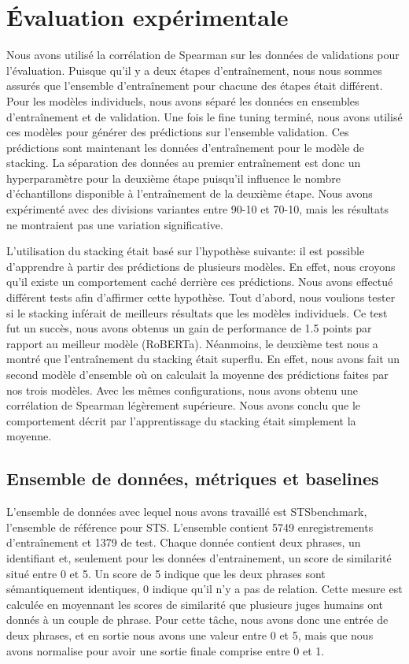 \documentclass[11pt,a4paper, french]{article}
\begin{document}
\section{Évaluation expérimentale }

Nous avons utilisé la corrélation de Spearman sur les données de validations pour l’évaluation. Puisque qu’il y a deux étapes d'entraînement, nous nous sommes assurés que l’ensemble d'entraînement pour chacune des étapes était différent. Pour les modèles individuels, nous avons séparé les données en ensembles d'entraînement et de validation. Une fois le fine tuning terminé, nous avons utilisé ces modèles pour générer des prédictions sur l’ensemble validation. Ces prédictions sont maintenant les données d'entraînement pour le modèle de stacking. La séparation des données au premier entraînement est donc un hyperparamètre pour la deuxième étape puisqu’il influence le nombre d’échantillons disponible à l'entraînement de la deuxième étape. Nous avons expérimenté avec des divisions variantes entre 90-10 et 70-10, mais les résultats ne montraient pas une variation significative. 

	L’utilisation du stacking était basé sur l’hypothèse suivante: il est possible d’apprendre à partir des prédictions de plusieurs modèles. En effet, nous croyons qu’il existe un comportement caché derrière ces prédictions. Nous avons effectué différent tests afin d’affirmer cette hypothèse. Tout d'abord, nous voulions tester si le stacking inférait de meilleurs résultats que les modèles individuels. Ce test fut un succès, nous avons obtenus un gain de performance de 1.5 points par rapport au meilleur modèle (RoBERTa). Néanmoins, le deuxième test nous a montré que l'entraînement du stacking était superflu. En effet, nous avons fait un second modèle d’ensemble où on calculait la moyenne des prédictions faites par nos trois modèles. Avec les mêmes configurations, nous avons obtenu une corrélation de Spearman légèrement supérieure. Nous avons conclu que le comportement décrit par l’apprentissage du stacking était simplement la moyenne.



\subsection{Ensemble de données, métriques et baselines }


L’ensemble de données avec lequel nous avons travaillé est STSbenchmark, l’ensemble de référence pour STS. L’ensemble contient 5749 enregistrements d'entraînement et 1379 de test. Chaque donnée contient deux phrases, un identifiant et, seulement pour les données d'entrainement, un score de similarité situé entre 0 et 5. Un score de 5 indique que les deux phrases sont sémantiquement identiques, 0 indique qu’il n’y a pas de relation. Cette mesure est calculée en moyennant les scores de similarité que plusieurs juges humains ont donnés à un couple de phrase. Pour cette tâche, nous avons donc une entrée de deux phrases, et en sortie nous avons une valeur entre 0 et 5, mais que nous avons normalise pour avoir une sortie finale comprise entre 0 et 1.
\end{document}
